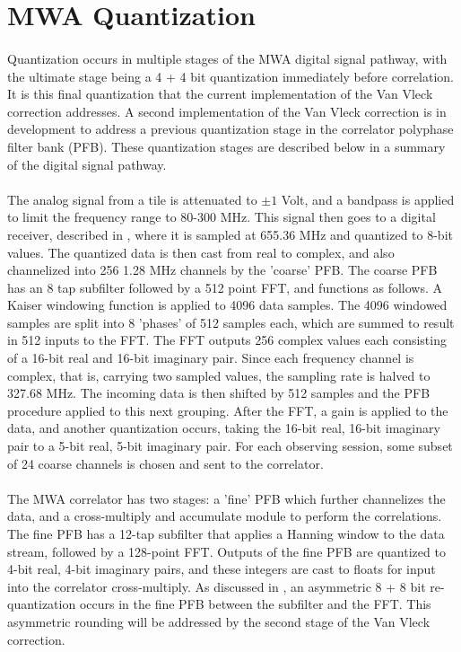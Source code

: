 \documentclass[11pt]{article}
\begin{document}
\section{MWA Quantization}
\paragraph{}
Quantization occurs in multiple stages of the MWA digital signal pathway, with the ultimate stage being a 4 + 4 bit quantization immediately before correlation. It is this final quantization that the current implementation of the Van Vleck correction addresses. A second implementation of the Van Vleck correction is in development to address a previous quantization stage in the correlator polyphase filter bank (PFB). These quantization stages are described below in a summary of the digital signal pathway.
\paragraph{}
The analog signal from a tile is attenuated to $\pm1$ Volt, and a bandpass is applied to limit the frequency range to 80-300 MHz. This signal then goes to a digital receiver, described in \cite{rec}, where it is sampled at 655.36 MHz and quantized to 8-bit values. The quantized data is then cast from real to complex, and also channelized into 256 1.28 MHz channels by the 'coarse' PFB. The coarse PFB has an 8 tap subfilter followed by a 512 point FFT, and functions as follows. A Kaiser windowing function is applied to 4096 data samples. The 4096 windowed samples are split into 8 'phases' of 512 samples each, which are summed to result in 512 inputs to the FFT. The FFT outputs 256 complex values each consisting of a 16-bit real and 16-bit imaginary pair. Since each frequency channel is complex, that is, carrying two sampled values, the sampling rate is halved to 327.68 MHz. The incoming data is then shifted by 512 samples and the PFB procedure applied to this next grouping. After the FFT, a gain is applied to the data, and another quantization occurs, taking the 16-bit real, 16-bit imaginary pair to a 5-bit real, 5-bit imaginary pair. For each observing session, some subset of 24 coarse channels is chosen and sent to the correlator. 
\paragraph{}
The MWA correlator \cite{corr} has two stages: a 'fine' PFB which further channelizes the data, and a cross-multiply and accumulate module to perform the correlations. The fine PFB  has a 12-tap subfilter that applies a Hanning window to the data stream, followed by a 128-point FFT. Outputs of the fine PFB are quantized to 4-bit real, 4-bit imaginary pairs, and these integers are cast to floats for input into the correlator cross-multiply. As discussed in \cite{pfb}, an asymmetric 8 + 8 bit re-quantization occurs in the fine PFB between the subfilter and the FFT. This asymmetric rounding will be addressed by the second stage of the Van Vleck correction.
\end{document}
